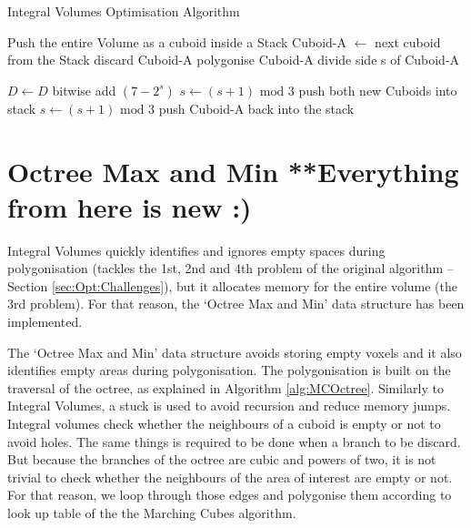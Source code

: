 \documentclass{subfiles}
\begin{document}
\begin{algorithm}[!htbp]
	\caption{Integral Volumes Optimisation Algorithm}
	\label{alg:IVoptAdvance}
	\centering
	\begin{algorithmic}[1]
		\State Push the entire Volume as a cuboid inside a Stack
			\State Cuboid-A   $\gets$  next cuboid from the Stack 
				\State	discard Cuboid-A
				\State polygonise Cuboid-A
				\State	divide side s of Cuboid-A 
		
					\State	$D \gets D$ bitwise add $(7-2^s)$
				\EndIf
				\State 	$s \gets (s+1) \text{ mod } 3$
				\State push both new Cuboids into stack
			\Else 
				\State $s \gets (s+1) \text{ mod } 3$
				\State push Cuboid-A back into the stack
			\EndIf
		\EndWhile
	\end{algorithmic}
\end{algorithm}

\newpage

\rhead{ }
\section{Octree Max and Min {\color{red} **Everything from here is new :)}} \label{sec:OctreeMaxMin}

\par Integral Volumes quickly identifies and ignores empty spaces during polygonisation (tackles the 1st, 2nd and 4th problem of the original algorithm -- Section \ref{sec:Opt:Challenges}), but it allocates memory for the entire volume (the 3rd problem). For that reason, the `Octree Max and Min' data structure has been implemented. 

\par The `Octree Max and Min' data structure avoids storing empty voxels and it also identifies empty areas during polygonisation. The polygonisation is built on the traversal of the octree, as explained in Algorithm \ref{alg:MCOctree}. Similarly to Integral Volumes, a stuck is used to avoid recursion and reduce memory jumps. Integral volumes check whether the neighbours of a cuboid is empty or not to avoid holes. The same things is required to be done when a branch to be discard. But because the branches of the octree are cubic and powers of two, it is not trivial to check whether the neighbours of the area of interest are empty or not. For that reason, we loop through those edges and polygonise them according to look up table of the the Marching Cubes algorithm. 
\end{document}
